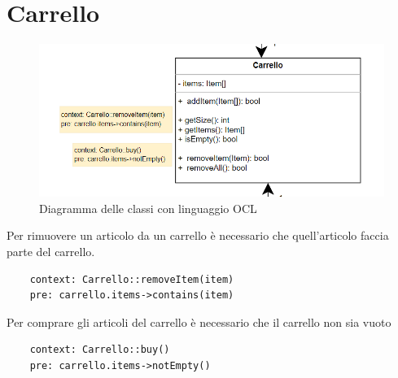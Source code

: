 \documentclass{report}
\begin{document}
\section{Carrello}
\begin{figure}[H]
	\centering\includegraphics[width=1\textwidth]{images/OCL/OCL_carrello.png}
	Diagramma delle classi con linguaggio OCL 
\end{figure}
Per rimuovere un articolo da un carrello è necessario che quell'articolo faccia parte del carrello.
\begin{verbatim}
	context: Carrello::removeItem(item)
	pre: carrello.items->contains(item)

\end{verbatim}
Per comprare gli articoli del carrello è necessario che il carrello non sia vuoto
\begin{verbatim}
	context: Carrello::buy()
	pre: carrello.items->notEmpty()

\end{verbatim}
\end{document}
